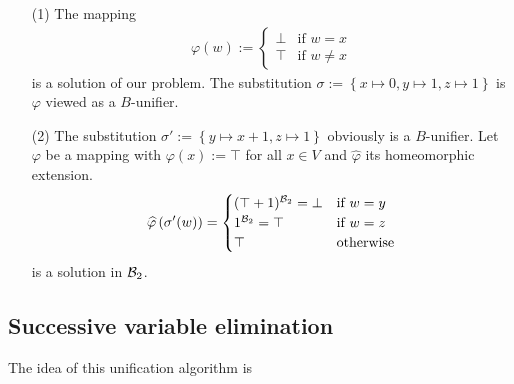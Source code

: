 		\begin{itemize}
		\item[(1)]The mapping 
		\begin{align*}
		\varphi(w):=\begin{cases}
		\bot& \text{if }w=x\\
		\top& \text{if }w\neq x
		\end{cases}
		\end{align*}is a solution of our problem. The substitution $\sigma:=\left\lbrace x\mapsto0,y\mapsto1,z\mapsto1\right\rbrace$ is $\varphi$ viewed as a $B$-unifier.
		\item[(2)]The substitution $\sigma':=\left\lbrace y\mapsto x+1,z\mapsto 1\right\rbrace $ obviously is a $B$-unifier. Let $\varphi$ be a mapping with $\varphi(x):=\top$ for all $x\in V$ and $\widehat{\varphi}$ its homeomorphic extension.
		\begin{align*}
		\widehat{\varphi}\left(\sigma'(w)\right)=\begin{cases}
		(\top+1)^{\mathcal{B}_2}=\bot& \text{if } w=y\\
		1^{\mathcal{B}_2}=\top& \text{if } w=z\\
		\top&  \text{otherwise}
		\end{cases}
		\end{align*}
		is a solution in ${\mathcal{B}_2}$.
		\end{itemize}
		\subsection{Successive variable elimination}
		The idea of this unification algorithm is %
		
